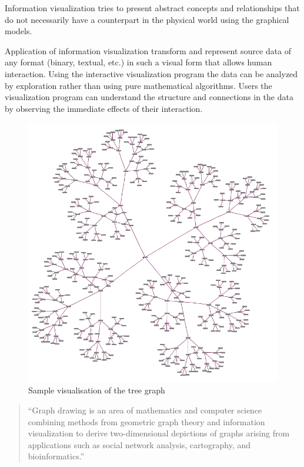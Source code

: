 Information visualization tries to present abstract concepts and relationships that do not necessarily have a counterpart in the physical world using the graphical models. 

Application of information visualization transform and represent source data of any format (binary, textual, etc.) in such a visual form that allows human interaction. Using the interactive visualization program the data can be analyzed by exploration rather than using pure mathematical algorithms. Users the visualization program can understand the structure and connections in the data by observing the immediate effects of their interaction. 

\begin{figure}[h!]
\centering
\includegraphics[scale=0.3]{pictures/Tree_graph_example.png}
\caption{Sample visualisation of the tree graph}
\label{fig:tree_graph_example}
\end{figure}

\begin{quotation}
``Graph drawing is an area of mathematics and computer science combining methods from geometric graph theory and information visualization to derive two-dimensional depictions of graphs arising from applications such as social network analysis, cartography, and bioinformatics.''~\cite{Graph_drawing}
\end{quotation}

